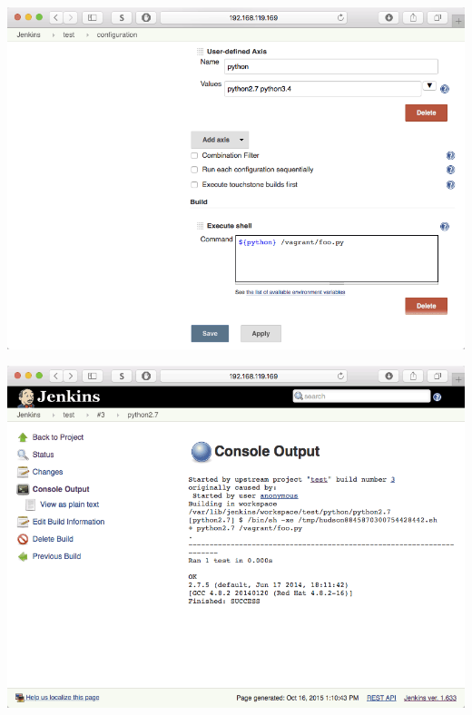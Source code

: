 \documentclass[xcolor=svgnames,17pt]{beamer}
\begin{document}
\begin{frame}[plain]{}
\includegraphics[width=\paperwidth,frame,center]{hello-5-multi-config-detail.png}
\end{frame}

\begin{frame}[plain]{}
\includegraphics[width=\paperwidth,frame,center]{hello-6-output-1.png}
\end{frame}
\end{document}
